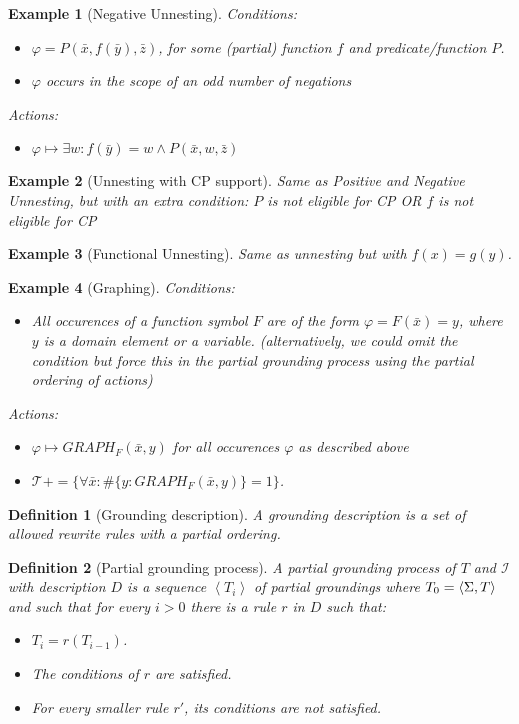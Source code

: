 \documentclass{article}
\newcommand{\I}{\mathcal{I}}
\newcommand{\seq}[1]{\left\langle#1\right\rangle}
\newcommand{\T}{\mathcal{T}}
\newtheorem{definition}{Definition}
\newtheorem{example}{Example}
\begin{document}
\begin{example}[Negative Unnesting]
Conditions:
\begin{itemize}
    \item  $\varphi = P(\bar x, f(\bar y),\bar z)$, for some (partial) function $f$ and predicate/function $P$.
	\item $\varphi$ occurs in the scope of an odd number of negations
\end{itemize}
Actions:
\begin{itemize}
    \item  $\varphi \mapsto \exists w: f(\bar y) = w \wedge P(\bar x, w,\bar z)$
\end{itemize}
\end{example}

\begin{example}[Unnesting with CP support]
    Same as Positive and Negative Unnesting, but with an extra condition:
    $P$ is not eligible for CP OR $f$ is not eligible for CP
\end{example}

\begin{example}[Functional Unnesting]
    Same as unnesting but with $f(x)=g(y)$.
\end{example}

\begin{example}[Graphing]
Conditions:
\begin{itemize}
    \item  All occurences of a function symbol $F$ are of the form $\varphi = F(\bar x) = y$, where $y$ is a domain element or a variable. (alternatively, we could omit the condition but force this in the partial grounding process using the partial ordering of actions)
\end{itemize}
Actions:
\begin{itemize}
    \item  $\varphi \mapsto GRAPH_F(\bar x, y)$ for all occurences $\varphi$ as described above
    \item $\T += \{\forall \bar x: \#\{y: GRAPH_F(\bar x, y)\} = 1\}$.
\end{itemize}
\end{example}

\begin{definition}[Grounding description]
A grounding description is a set of allowed rewrite rules with a partial ordering.
\end{definition}

\begin{definition}[Partial grounding process]
A \textit{partial grounding process} of $T$ and $\I$ with description $D$ is a sequence $\seq{T_i}$ of partial groundings where $T_0= \seq{\voc,T}$ and such that for every $i>0$ there is a rule $r$ in $D$ such that:
\begin{itemize}
    \item $T_i = r(T_{i-1})$.
    \item The conditions of $r$ are satisfied.
    \item For every smaller rule $r'$, its conditions are not satisfied.
\end{itemize}
\end{definition}
\end{document}
